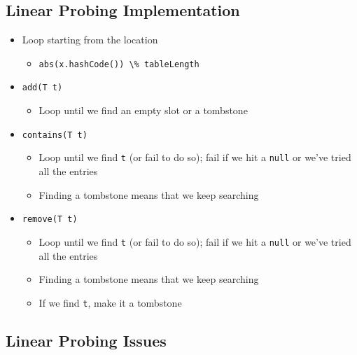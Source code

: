 \documentclass[
  10pt,
  english,
  letterpaper,
,tablecaptionabove
]{scrartcl}
\newcommand{\passthrough}[1]{#1}
\providecommand{\tightlist}{%
  \setlength{\itemsep}{0pt}\setlength{\parskip}{0pt}}
\begin{document}
\hypertarget{linear-probing-implementation}{%
\subsection{Linear Probing
Implementation}\label{linear-probing-implementation}}

\begin{itemize}
\tightlist
\item
  Loop starting from the location

  \begin{itemize}
  \tightlist
  \item
    \passthrough{\lstinline!abs(x.hashCode()) \% tableLength!}
  \end{itemize}
\item
  \passthrough{\lstinline!add(T t)!}

  \begin{itemize}
  \tightlist
  \item
    Loop until we find an empty slot or a tombstone
  \end{itemize}
\item
  \passthrough{\lstinline!contains(T t)!}

  \begin{itemize}
  \tightlist
  \item
    Loop until we find \passthrough{\lstinline!t!} (or fail to do so);
    fail if we hit a \passthrough{\lstinline!null!} or we've tried all
    the entries
  \item
    Finding a tombstone means that we keep searching
  \end{itemize}
\item
  \passthrough{\lstinline!remove(T t)!}

  \begin{itemize}
  \tightlist
  \item
    Loop until we find \passthrough{\lstinline!t!} (or fail to do so);
    fail if we hit a \passthrough{\lstinline!null!} or we've tried all
    the entries
  \item
    Finding a tombstone means that we keep searching
  \item
    If we find \passthrough{\lstinline!t!}, make it a tombstone
  \end{itemize}
\end{itemize}

\hypertarget{linear-probing-issues}{%
\subsection{Linear Probing Issues}\label{linear-probing-issues}}
\end{document}
